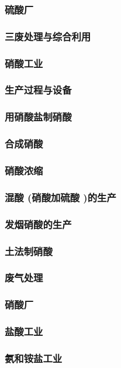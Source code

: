 \documentclass[UTF8]{../../ApplicationUniverse}
\begin{document}
        \subsubsection{硫酸厂}
        \subsubsection{三废处理与综合利用}
    \subsubsection{硝酸工业}
        \subsubsection{生产过程与设备}
            \subsubsection{用硝酸盐制硝酸}
            \subsubsection{合成硝酸}
            \subsubsection{硝酸浓缩}
            \subsubsection{混酸 (硝酸加硫酸 )的生产}
            \subsubsection{发烟硝酸的生产}
            \subsubsection{土法制硝酸}
            \subsubsection{废气处理}
        \subsubsection{硝酸厂}
    \subsubsection{盐酸工业}
\subsubsection{氨和铵盐工业}
\end{document}
